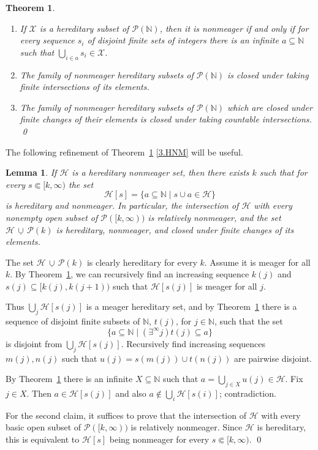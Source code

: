 \documentclass{amsart}
\makeatletter
\def\p{{\mathcal P}}              %
\def\N{\mathbb N}                        %
\def\X{{\mathcal X}}
\newtheorem{theorem}[proposition]{Theorem}
\newtheorem{lemma}[proposition]{Lemma}
\theoremstyle{definition}
\theoremstyle{remark}
\newcommand{\ucup}{\,\underline{\cup}\,}
\renewcommand{\proofname}{Proof}
\renewenvironment{proof}[1][\proofname]{\par
\let\oldqedsymbol\qedsymbol             %
  \normalfont
  \topsep6\p@\@plus6\p@ \trivlist
  \item[\hskip\labelsep\hskip\parindent\scshape
    #1\@addpunct{.}]\ignorespaces
}{%
  \qed\endtrivlist
\global\let\qedsymbol\oldqedsymbol      %
}
\newcommand{\cP}{\mathcal P}
\newcommand{\bbN}{\mathbb N}
\newcommand{\calH}{\mathcal H}
\numberwithin{claim}{subsection}
\makeatother
\begin{document}
\begin{theorem} \label{T.HNM}
	\label{chOCAc.1}
	\begin{enumerate}
		\item 
		If $\X$ is a hereditary subset of $\p(\N)$, 
		then it 
		is nonmeager
		if and only if for every sequence $s_i$ of disjoint finite sets of
		integers there is an infinite $a\subseteq \N$ such that 
		$\bigcup_{i\in a}s_i\in \X$.
		\item   The family of nonmeager hereditary subsets of $\p(\N)$ is closed
		under taking finite intersections of its elements. 
		\item  \label{3.HNM}
		The family of nonmeager hereditary subsets 
		of $\p(\N)$ which are closed under finite changes of their  elements
		is closed under taking countable intersections. \qed 
	\end{enumerate}
\end{theorem}

The following refinement of Theorem~\ref{T.HNM} \eqref{3.HNM} will be useful. 

\begin{lemma}\label{L.HNM.1} If $\calH$  is a hereditary nonmeager set, then there exists $k$ such that for every $s\Subset [k,\infty)$ the set 
	\[
	\calH[s]=\{a\subseteq \bbN\mid s\cup a\in \calH\}
	\]
	is hereditary and nonmeager. 
	In particular, the intersection of $\calH$ with every nonempty open subset of $\cP([k,\infty))$ is relatively nonmeager, and the set $\calH\ucup \cP(k)$ is hereditary, nonmeager, and closed under finite changes of its elements. 
\end{lemma}	

\begin{proof} The set $\calH\ucup \cP(k)$  is clearly hereditary for every $k$. Assume it is meager for all $k$. By Theorem~\ref{T.HNM}, we can recursively find an increasing sequence $k(j)$ and $s(j)\subseteq [k(j), k(j+1))$ such that $\calH[s(j)]$ is meager for all $j$.
	
	Thus $\bigcup_j \calH[s(j)]$ is a meager hereditary set, and by Theorem~\ref{T.HNM} there is a sequence of disjoint finite subsets of $\bbN$, $t(j)$, for $j\in \bbN$, such that the set
	\[
	\{a\subseteq \bbN\mid (\exists^\infty j) t(j)\subseteq a\}
	\]
	 is disjoint from $\bigcup_j \calH[s(j)]$. Recursively find increasing sequences $m(j), n(j)$ such that $u(j)=s(m(j))\cup t(n(j))$ are pairwise disjoint. 
	
	By Theorem~\ref{T.HNM} there is an infinite $X\subseteq \bbN$ such that $a=\bigcup_{j\in X} u(j)\in \calH$. Fix $j\in X$. Then $a\in \calH[s(j)]$ and also $a\notin\bigcup_i \calH[s(i)]$; contradiction. 
	
	For the second claim, it suffices to prove that the intersection of $\calH$ with every basic open subset of $\cP([k,\infty))$ is relatively nonmeager. Since $\calH$ is hereditary, this is equivalent to $\calH[s]$ being nonmeager for every $s\Subset [k,\infty)$. 
\end{proof}
\end{document}

